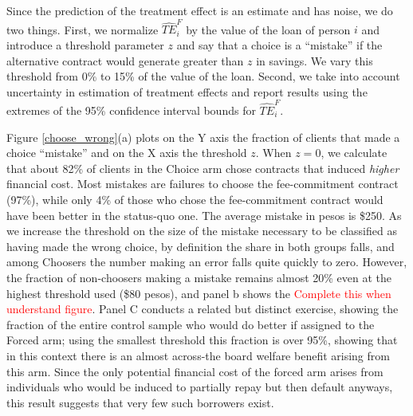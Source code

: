 \documentclass[oneside,11pt]{article}
\begin{document}
{%


Since the prediction of the treatment effect is an estimate and has noise, we do two things. First, we normalize $\widehat{TE}^{F}_{i}$ by the value of the loan of person $i$ and introduce a threshold parameter $z$ and say that a choice is a ``mistake'' if the alternative contract would generate greater than $z$ in savings. We vary this threshold from 0\% to 15\% of the value of the loan. Second, we take into account uncertainty in estimation of treatment effects and report results using the extremes of the 95\% confidence interval bounds for $\widehat{TE}^{F}_{i}$.

Figure \ref{choose_wrong}(a) plots on the Y axis the fraction of clients that made a choice ``mistake'' and on the X axis the threshold $z$. When $z=0$, we calculate that about 82\% of clients in the Choice arm chose contracts that induced \textit{higher} financial cost. Most mistakes are failures to choose the fee-commitment contract ({97}\%), while only {4}\% of those who chose the fee-commitment contract would have been better in the status-quo one. The average mistake in pesos is \$250. %
As we increase the threshold on the size of the mistake necessary to be classified as having made the wrong choice, by definition the share in both groups falls, and among Choosers the number making an error falls quite quickly to zero.  However, the fraction of non-choosers making a mistake remains almost 20\% even at the highest threshold used (\$80 pesos), and panel b shows the \textcolor{red}{Complete this when understand figure}.  Panel C conducts a related but distinct exercise, showing the fraction of the entire control sample who would do better if assigned to the Forced arm; using the smallest threshold this fraction is over 95\%, showing that in this context there is an almost across-the board welfare benefit arising from this arm.  Since the only potential financial cost of the forced arm arises from individuals who would be induced to partially repay but then default anyways, this result suggests that very few such borrowers exist.

}
\end{document}
